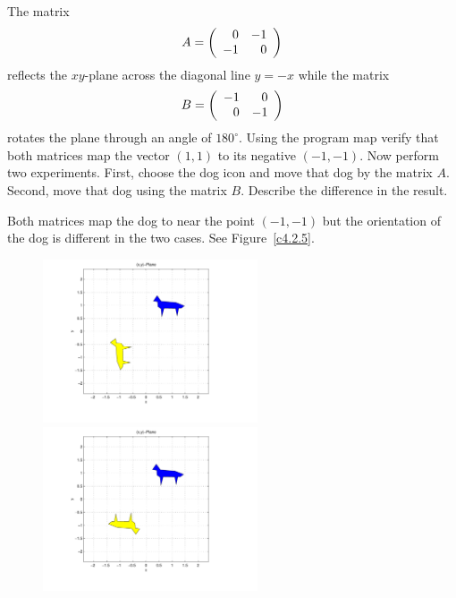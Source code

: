\documentclass{ximera}
\begin{document}
\begin{computerExercise}  \label{c4.2.5}
The matrix 
\[
A = \left(\begin{array}{rr} 0 & -1\\ -1 &0\end{array}\right)
\]
reflects the $xy$-plane across the diagonal line $y=-x$ while the matrix
\[
B=\left(\begin{array}{rr} -1 & 0\\ 0 &-1\end{array}\right)
\]
rotates the plane through an angle of $180^\circ$. Using the program 
{\sf map} verify that both matrices map the vector $(1,1)$ to its negative
$(-1,-1)$.  Now perform two experiments.  First, choose the {\sf dog} icon 
and move that dog by the matrix $A$.  Second, move that dog using the 
matrix $B$.  Describe the difference in the result.

\begin{solution}
Both matrices map the dog to near the point $(-1,-1)$ but the
orientation of the dog is different in the two cases.  See 
Figure~\ref{c4.2.5}.
\begin{figure}[htb]
     \centerline{%
     \includegraphics[width=2.5in]{exfigure/fig3-2-26a.pdf}\hspace*{-0.6in}
     \includegraphics[width=2.5in]{exfigure/fig3-2-26b.pdf}}
\end{figure} 
\end{solution}
\end{computerExercise}   
\end{document}
